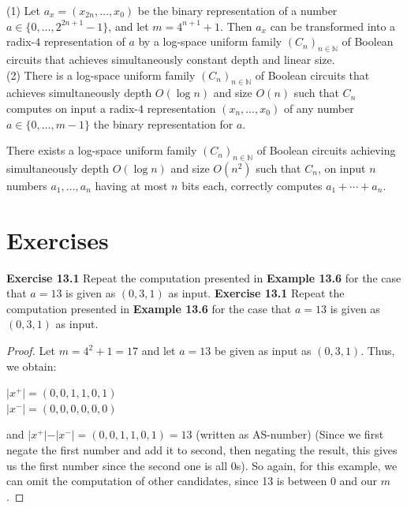 \documentclass[a4paper]{article}
\begin{document}
\begin{samepage}
\begin{theorem}
(1) Let $a_{x} = (x_{2n}, \ldots, x_{0})$ be the binary representation of a number $a \in \{ 0, \ldots, 2^{2n+1} - 1 \}$, and let $m = 4^{n + 1} + 1$. Then $a_{x}$ can be transformed into a radix-$4$ representation of $a$ by a log-space uniform family $(C_{n})_{n \in \mathbb{N}}$ of Boolean circuits that achieves simultaneously constant depth and linear size. \\
(2) There is a log-space uniform family $(C_{n})_{n \in \mathbb{N}}$ of Boolean circuits that achieves simultaneously depth $O(\log{n})$ and size $O(n)$ such that $C_{n}$ computes on input a radix-$4$ representation $(x_{n}, \ldots, x_{0})$ of any number $a \in \{ 0, \ldots, m - 1 \}$ the binary representation for $a$.
\end{theorem}
\end{samepage}


\begin{theorem}
There exists a log-space uniform family $(C_{n})_{n \in \mathbb{N}}$ of Boolean circuits achieving simultaneously depth $O(\log{n})$ and size $O(n^{2})$ such that $C_{n}$, on input $n$ numbers $a_{1}, \ldots, a_{n}$ having at most $n$ bits each, correctly computes $a_{1} + \cdots + a_{n}$.
\end{theorem}



\section{Exercises}
\noindent \textbf{Exercise 13.1}  Repeat the computation presented in \textbf{Example 13.6} for the case that $a = 13$ is given as $(0, 3, 1)$ as input.
\noindent \textbf{Exercise 13.1}  Repeat the computation presented in \textbf{Example 13.6} for the case that $a = 13$ is given as $(0, 3, 1)$ as input.
\begin{proof}
Let $m = 4^{2} + 1 = 17$ and let $a=13$ be given as input as $(0, 3, 1)$.
Thus, we obtain:
\begin{center}
$\vert x^{+} \vert = (0,0,1,1,0,1)$\\
$\vert x^{-} \vert = (0,0,0,0,0,0)$
\end{center}
and $\vert x^{+} \vert - \vert x^{-} \vert =(0,0,1,1,0,1) =13$ (written as AS-number) (Since we first negate the first number and add it to second, then negating the result, this gives us the first number since the second one is all 0s). So again, for this example, we can omit the computation of other candidates, since 13 is between 0 and our $m$.
\end{proof}
\end{document}

